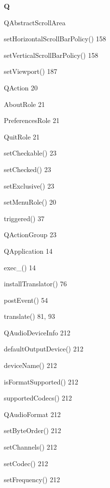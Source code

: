 \documentclass{book}
\renewcommand\indexspace{\vspace{11pt}}
\renewcommand\subitem{\par}
\begin{document}
\begin{multicols}{2}
\begin{osp-index}
  \indexspace
{\sffamily\bfseries Q}\nopagebreak

  \item QAbstractScrollArea
    \subitem setHorizontalScrollBarPolicy()\hspace{1mm} 158
    \subitem setVerticalScrollBarPolicy()\hspace{1mm} 158
    \subitem setViewport()\hspace{1mm} 187
  \item QAction\hspace{1mm} 20
    \subitem AboutRole\hspace{1mm} 21
    \subitem PreferencesRole\hspace{1mm} 21
    \subitem QuitRole\hspace{1mm} 21
    \subitem setCheckable()\hspace{1mm} 23
    \subitem setChecked()\hspace{1mm} 23
    \subitem setExclusive()\hspace{1mm} 23
    \subitem setMenuRole()\hspace{1mm} 20
    \subitem triggered()\hspace{1mm} 37
  \item QActionGroup\hspace{1mm} 23
  \item QApplication\hspace{1mm} 14
    \subitem exec\_()\hspace{1mm} 14
    \subitem installTranslator()\hspace{1mm} 76
    \subitem postEvent()\hspace{1mm} 54
    \subitem translate()\hspace{1mm} 81, 93
  \item QAudioDeviceInfo\hspace{1mm} 212
    \subitem defaultOutputDevice()\hspace{1mm} 212
    \subitem deviceName()\hspace{1mm} 212
    \subitem isFormatSupported()\hspace{1mm} 212
    \subitem supportedCodecs()\hspace{1mm} 212
  \item QAudioFormat\hspace{1mm} 212
    \subitem setByteOrder()\hspace{1mm} 212
    \subitem setChannels()\hspace{1mm} 212
    \subitem setCodec()\hspace{1mm} 212
    \subitem setFrequency()\hspace{1mm} 212

\end{osp-index}
\end{multicols}
\end{document}
